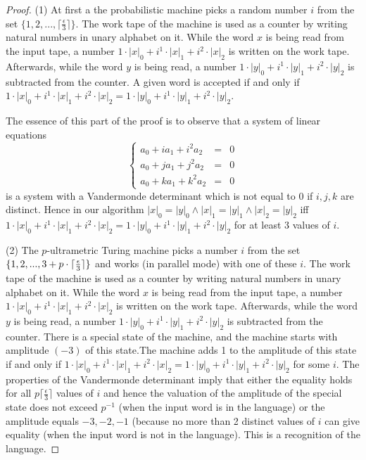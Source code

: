 \documentclass{llncs}
\begin{document}
\begin{proof}
(1) At first a the probabilistic machine picks a random number $i$ from the set $\{1, 2, ... , \lceil \frac{\epsilon}{3}\rceil \}$. 
The work tape of the machine is used as a counter by writing natural numbers in unary alphabet on it. While the word $x$ is being read from the input tape, a number $1\cdot|x|_0 + i^1\cdot|x|_1 + i^2\cdot|x|_2$ is written on the work tape. Afterwards, while the word $y$ is being read, a number $1\cdot|y|_0 + i^1\cdot|y|_1 + i^2\cdot|y|_2$ is subtracted from the counter. A given word is accepted if and only if $1\cdot|x|_0 + i^1\cdot|x|_1 + i^2\cdot|x|_2 = 1\cdot|y|_0 + i^1\cdot|y|_1 + i^2\cdot|y|_2$. 

The essence of this part of the proof is to observe that a system of linear equations
$$
\left\{
\begin{array}{lcl}
a_0 + ia_1 + i^2a_2 & = & 0\\ 
a_0 + ja_1 + j^2a_2 & = & 0\\ 
a_0 + ka_1 + k^2a_2 & = & 0
\end{array}
\right.
$$
is a system with a Vandermonde determinant which is not equal to 0 if $i,j,k$ are distinct. Hence in our algorithm
$|x|_0 = |y|_0  \wedge |x|_1 = |y|_1 \wedge  |x|_2 = |y|_2$ iff $1\cdot|x|_0 + i^1\cdot|x|_1 + i^2\cdot|x|_2 = 1\cdot|y|_0 + i^1\cdot|y|_1 + i^2\cdot|y|_2$ for
at least 3 values of $i$.

\bigskip

(2) The $p$-ultrametric Turing machine picks a  number $i$ from the set $\{1, 2, ... ,\\ 3+p\cdot\lceil \frac{\epsilon}{3}\rceil \}$ and works (in parallel mode) with one of these $i$.
The work tape of the machine is used as a counter by writing natural numbers in unary alphabet on it. While the word $x$ is being read from the input tape, a number $1\cdot|x|_0 + i^1\cdot|x|_1 + i^2\cdot|x|_2$ is written on the work tape. Afterwards, while the word $y$ is being read, a number $1\cdot|y|_0 + i^1\cdot|y|_1 + i^2\cdot|y|_2$ is subtracted from the counter. There is a special state of the machine, and the machine starts with amplitude $(-3)$ of this state.The machine 
adds 1 to the amplitude of this state 
 if and only if $1\cdot|x|_0 + i^1\cdot|x|_1 + i^2\cdot|x|_2 = 1\cdot|y|_0 + i^1\cdot|y|_1 + i^2\cdot|y|_2$ for some $i$. The properties of the Vandermonde determinant imply that either the equality holds for all $p\lceil \frac{\epsilon}{3}\rceil $ values of $i$ and hence the valuation of the amplitude of the special state does not exceed $p^{-1}$
 (when the input word is in the language) or the amplitude equals $-3, -2, -1$ (because no more than 2 distinct values of $i$ can give equality 
(when the input word is not in the language). This is a recognition of the language.




\end{proof}
\end{document}
